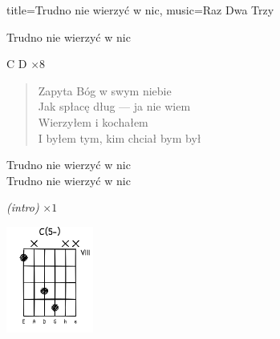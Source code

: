 \begin{song}{title={Trudno nie wierzyć w nic}, music={Raz Dwa Trzy}}
\begin{multicols}{2}
\begin{chorus}
        Trudno nie wierzyć w nic
    \end{chorus}
    \begin{solo}
        C D $\times 8$
    \end{solo}
    \begin{verse}
        Zapyta Bóg w swym niebie \\
        Jak spłacę dług --- ja nie wiem \\
        Wierzyłem i kochałem \\
        I byłem tym, kim chciał bym był
    \end{verse}
    \begin{chorus}
        Trudno nie wierzyć w nic \\
        Trudno nie wierzyć w nic
    \end{chorus}
    \begin{outro}
        \textit{(intro)} $\times 1$
    \end{outro}
    \vfill\null\columnbreak{}
    \begin{center}
        \includegraphics[height=3.5cm]{images/C5dim.png}
    \end{center}
    \end{multicols}
\end{song}

